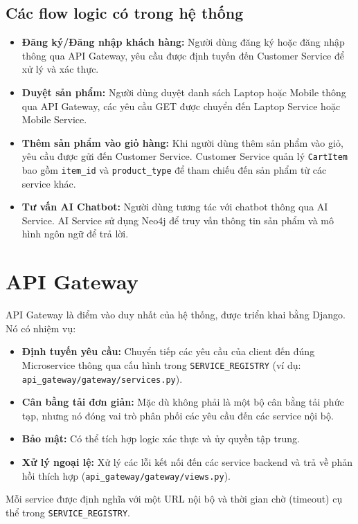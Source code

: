 \documentclass[12pt,a4paper]{report}
\begin{document}
\subsection{Các flow logic có trong hệ thống}
\begin{itemize}
    \item \textbf{Đăng ký/Đăng nhập khách hàng:} Người dùng đăng ký hoặc đăng nhập thông qua API Gateway, yêu cầu được định tuyến đến Customer Service để xử lý và xác thực.
    \item \textbf{Duyệt sản phẩm:} Người dùng duyệt danh sách Laptop hoặc Mobile thông qua API Gateway, các yêu cầu GET được chuyển đến Laptop Service hoặc Mobile Service.
    \item \textbf{Thêm sản phẩm vào giỏ hàng:} Khi người dùng thêm sản phẩm vào giỏ, yêu cầu được gửi đến Customer Service. Customer Service quản lý \texttt{CartItem} bao gồm \texttt{item\_id} và \texttt{product\_type} để tham chiếu đến sản phẩm từ các service khác.
    \item \textbf{Tư vấn AI Chatbot:} Người dùng tương tác với chatbot thông qua AI Service. AI Service sử dụng Neo4j để truy vấn thông tin sản phẩm và mô hình ngôn ngữ để trả lời.
\end{itemize}

\section{API Gateway}
API Gateway là điểm vào duy nhất của hệ thống, được triển khai bằng Django. Nó có nhiệm vụ:
\begin{itemize}
    \item \textbf{Định tuyến yêu cầu:} Chuyển tiếp các yêu cầu của client đến đúng Microservice thông qua cấu hình trong \texttt{SERVICE\_REGISTRY} (ví dụ: \texttt{api\_gateway/gateway/services.py}).
    \item \textbf{Cân bằng tải đơn giản:} Mặc dù không phải là một bộ cân bằng tải phức tạp, nhưng nó đóng vai trò phân phối các yêu cầu đến các service nội bộ.
    \item \textbf{Bảo mật:} Có thể tích hợp logic xác thực và ủy quyền tập trung.
    \item \textbf{Xử lý ngoại lệ:} Xử lý các lỗi kết nối đến các service backend và trả về phản hồi thích hợp (\texttt{api\_gateway/gateway/views.py}).
\end{itemize}
Mỗi service được định nghĩa với một URL nội bộ và thời gian chờ (timeout) cụ thể trong \texttt{SERVICE\_REGISTRY}.
\end{document}
